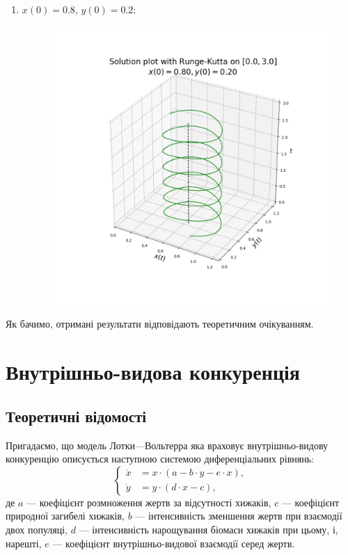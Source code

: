 \begin{enumerate}
\begin{enumerate}
\begin{figure}
		\end{figure}
		\item $x(0) = 0.8$, $y(0) = 0.2$:
		\begin{figure}
			\centering
			\includegraphics[width=\textwidth]{plot_3d_0.80_0.20.png}
		\end{figure}
	\end{enumerate}
\end{enumerate}

Як бачимо, отримані результати відповідають теоретичним очікуванням. \medskip

\section{Внутрішньо-видова конкуренція}

\subsection{Теоретичні відомості}

Пригадаємо, що модель Лотки---Вольтерра яка враховує внутрішньо-видову конкуренцію описується наступною системою диференціальних рівнянь:
\begin{equation}
	\left\{
		\begin{aligned}
			\dot x &= x \cdot (a - b \cdot y - e \cdot x), \\
			\dot y &= y \cdot (d \cdot x - c),
		\end{aligned}
	\right.
\end{equation}
де $a$ --- коефіцієнт розмноження жертв за відсутності хижаків, $c$ --- коефіцієнт природної загибелі хижаків, $b$ --- інтенсивність зменшення жертв при взаємодії двох популяці, $d$ --- інтенсивність нарощування біомаси хижаків при цьому, і, нарешті, $e$ --- коефіцієнт внутрішньо-видової взаємодії серед жертв. \medskip

